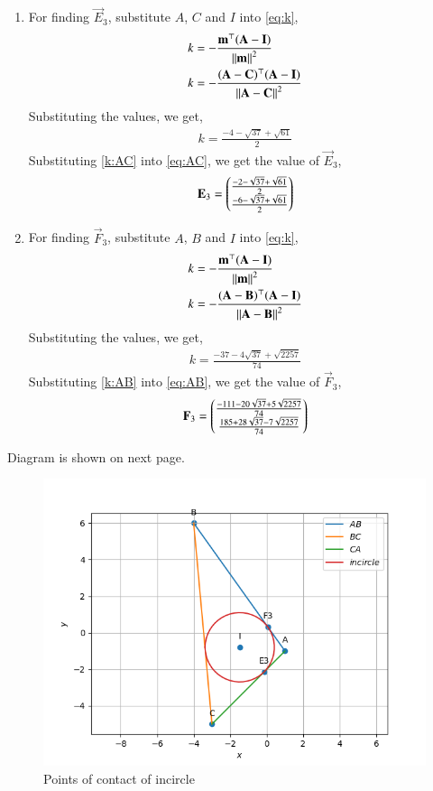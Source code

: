 \documentclass[journal,12pt,twocolumn]{IEEEtran}
\theoremstyle{remark}
\begin{document}
\begin{enumerate}
	\item For finding $\vec{E}_3$, substitute $A$, $C$ and $I$ into \eqref{eq:k},
		\begin{align}
			k &= -\frac{\mathbf{m}^{\top}(\mathbf{A} - \mathbf{I})}{\left\lVert\mathbf{m}\right\rVert^2} \\
			k &= -\frac{(\mathbf{A}-\mathbf{C})^{\top}(\mathbf{A} - \mathbf{I})}{\left\lVert\mathbf{A}-\mathbf{C}\right\rVert^2}
		\end{align}
		Substituting the values, we get,
		\begin{align}
			k = \frac{-4-\sqrt{37}+\sqrt{61}}{2} \label{k:AC} 
		\end{align}
		Substituting \eqref{k:AC} into \eqref{eq:AC}, we get the value of $\vec{E}_3$,
		\begin{align}
			\mathbf{E}_3 = \begin{pmatrix}
				\frac{-2-\sqrt{37}+\sqrt{61}}{2}\\ 
				\frac{-6-\sqrt{37}+\sqrt{61}}{2}
			\end{pmatrix}
		\end{align}
	\item For finding $\vec{F}_3$, substitute $A$, $B$ and $I$ into \eqref{eq:k},
		\begin{align}
			k &= -\frac{\mathbf{m}^{\top}(\mathbf{A} - \mathbf{I})}{\left\lVert\mathbf{m}\right\rVert^2} \\
			k &= -\frac{(\mathbf{A}-\mathbf{B})^{\top}(\mathbf{A} - \mathbf{I})}{\left\lVert\mathbf{A}-\mathbf{B}\right\rVert^2}
		\end{align}
		Substituting the values, we get,
		\begin{align}
			k = \frac{-37-4\sqrt{37}+\sqrt{2257}}{74} \label{k:AB}
		\end{align}
		Substituting \eqref{k:AB} into \eqref{eq:AB}, we get the value of $\vec{F}_3$,
		\begin{align}
			\mathbf{F}_3 = \begin{pmatrix}
				\frac{-111-20\sqrt{37}+5\sqrt{2257}}{74}\\ 
				\frac{185+28\sqrt{37}-7\sqrt{2257}}{74}
			\end{pmatrix}
		\end{align}
\end{enumerate}
	
	

Diagram is shown on next page.



\newpage

\begin{figure}[h]
	\centering
	\includegraphics[width=\columnwidth]{./figs/Diagram.png}
	\caption{Points of contact of incircle}
	\label{Incircle}
\end{figure}
\end{document}
